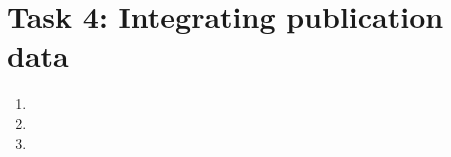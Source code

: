 \documentclass{scrartcl}
\begin{document}
	\section*{Task 4: Integrating publication data}
	\begin{enumerate}
		\item
		\item
		\item
	\end{enumerate}
	
\end{document}
